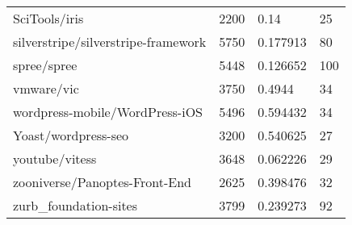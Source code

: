 \begin{table}[]
\begin{tabular}{llll}
SciTools/iris                               & 2200                               & 0.14                                                                                                              & 25                                                                                                            \\
silverstripe/silverstripe-framework         & 5750                               & 0.177913                                                                                                          & 80                                                                                                            \\
spree/spree                                 & 5448                               & 0.126652                                                                                                          & 100                                                                                                           \\
vmware/vic                                  & 3750                               & 0.4944                                                                                                            & 34                                                                                                            \\
wordpress-mobile/WordPress-iOS              & 5496                               & 0.594432                                                                                                          & 34                                                                                                            \\
Yoast/wordpress-seo                         & 3200                               & 0.540625                                                                                                          & 27                                                                                                            \\
youtube/vitess                              & 3648                               & 0.062226                                                                                                          & 29                                                                                                            \\
zooniverse/Panoptes-Front-End               & 2625                               & 0.398476                                                                                                          & 32                                                                                                            \\ 
zurb\_foundation-sites & 3799 & 0.239273 & 92                                                                                       \\ \hline 
\end{tabular}
\end{table}
